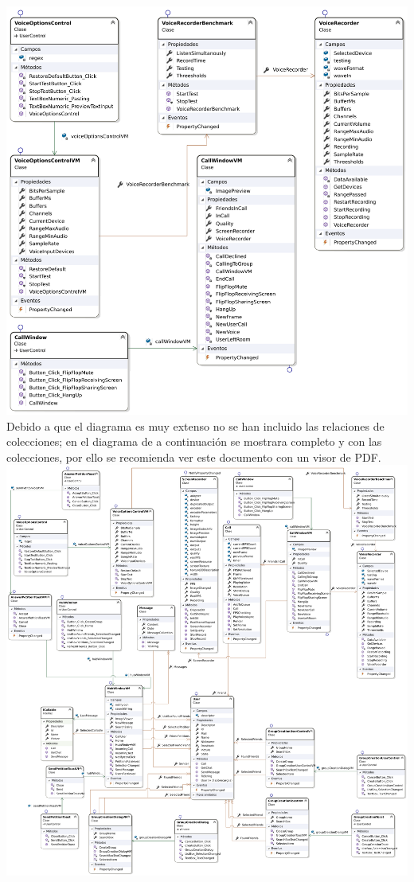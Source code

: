 \documentclass[12pt, a4paper]{book} %
\begin{document}
			\includegraphics[width=\textwidth,height=\textheight, keepaspectratio]{img/BacoClientDiagram3.pdf}\\
			Debido a que el diagrama es muy extenso no se han incluido las relaciones de colecciones; en el diagrama de a continuación se mostrara completo y con las colecciones, por ello se recomienda ver este documento con un visor de PDF.\\
			\includegraphics[width=\textwidth,height=\textheight]{img/BacoClientDiagramAll.pdf}\\
\end{document}
